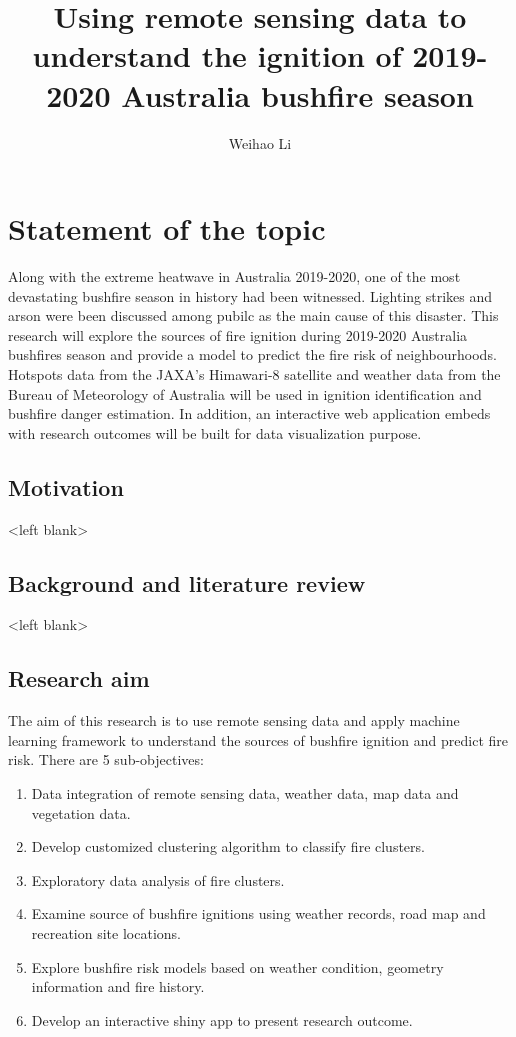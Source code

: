 \documentclass{monashthesis}
\author{Weihao Li}
\title{Using remote sensing data to understand the ignition of 2019-2020
Australia bushfire season}
\begin{document}

\titlepage

{\sf\tighttoc\doublespacing}

\clearpage{}\setcounter{page}{0}

\chapter{Statement of the topic}\label{ch:intro}

Along with the extreme heatwave in Australia 2019-2020, one of the most
devastating bushfire season in history had been witnessed. Lighting
strikes and arson were been discussed among pubilc as the main cause of
this disaster. This research will explore the sources of fire ignition
during 2019-2020 Australia bushfires season and provide a model to
predict the fire risk of neighbourhoods. Hotspots data from the JAXA's
Himawari-8 satellite and weather data from the Bureau of Meteorology of
Australia will be used in ignition identification and bushfire danger
estimation. In addition, an interactive web application embeds with
research outcomes will be built for data visualization purpose.

\section{Motivation}\label{motivation}

\textless{}left blank\textgreater{}

\section{Background and literature
review}\label{background-and-literature-review}

\textless{}left blank\textgreater{}

\section{Research aim}\label{research-aim}

The aim of this research is to use remote sensing data and apply machine
learning framework to understand the sources of bushfire ignition and
predict fire risk. There are 5 sub-objectives:

\begin{enumerate}
\def\labelenumi{\arabic{enumi}.}
\tightlist
\item
  Data integration of remote sensing data, weather data, map data and
  vegetation data.
\item
  Develop customized clustering algorithm to classify fire clusters.
\item
  Exploratory data analysis of fire clusters.
\item
  Examine source of bushfire ignitions using weather records, road map
  and recreation site locations.
\item
  Explore bushfire risk models based on weather condition, geometry
  information and fire history.
\item
  Develop an interactive shiny app to present research outcome.
\end{enumerate}
\end{document}
